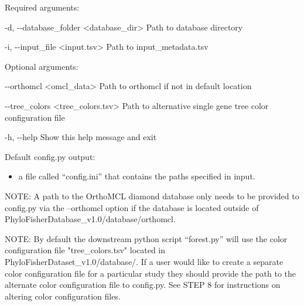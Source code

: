 \documentclass{article}
\begin{document}
\begin{enumerate}[itemsep=12pt]
        \begin{description}
            \item Required arguments:
            \begin{description}
                \item -d, -\/-database\_folder \hspace{0.2cm} <database\_dir> \hspace{0.2cm} Path to database directory
                \item -i, -\/-input\_file \hspace{0.2cm} <input.tsv> \hspace{0.2cm} Path to input\_metadata.tsv
            \end{description}
            \vspace{0.2cm}
            \item Optional arguments:
            \begin{description}
                \item -\/-orthomcl \hspace{0.2cm} <omcl\_data> \hspace{0.2cm} Path to orthomcl if not in default location
                \item -\/-tree\_colors \hspace{0.2cm} <tree\_colors.tsv> \hspace{0.2cm} Path to alternative single gene tree color configuration file
                \item -h, -\/-help \hspace{0.2cm} Show this help message and exit
            \end{description}
            \vspace{0.2cm}
            \item Default config.py output:
            \begin{itemize}
                \item a file called “config.ini” that contains the paths specified in input.
            \end{itemize}
        \end{description}
        \vspace{0.5cm}
        NOTE: A path to the OrthoMCL diamond database only needs to be provided to config.py via the     --orthomcl option if the database is located outside of PhyloFisherDatabase\_v1.0/database/orthomcl.
        
        \vspace{0.1cm}
        NOTE: By default the downstream python script “forest.py” will use the color configuration file "tree\_colors.tsv" located in PhyloFisherDataset\_v1.0/database/. If a user would like to create a separate color configuration file for a particular study they should provide the path to the alternate color configuration file to config.py. See STEP 8 for instructions on altering color configuration files.
        

\end{enumerate}
\end{document}
